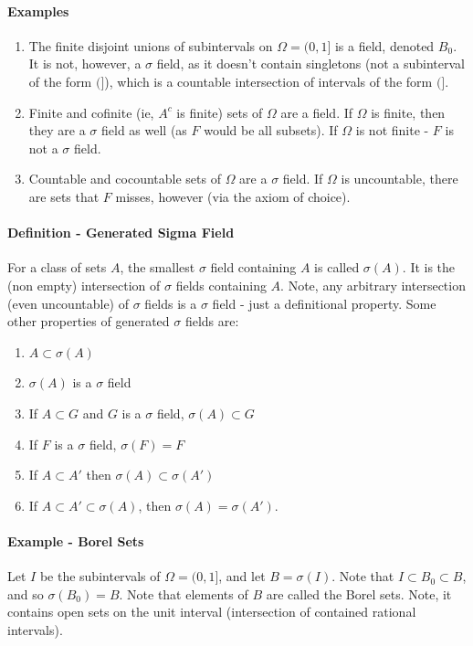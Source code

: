 \documentclass[12pt,a4paper]{article}
\newcommand{\1}[1]{\mathbbm{1}\left\{ #1 \right\}}
\begin{document}
\paragraph{Examples}
\begin{enumerate}
	\item The finite disjoint unions of subintervals on $\Omega = (0,1]$ is a field, denoted $B_0$. It is not, however, a $\sigma$ field, as it doesn't contain singletons (not a subinterval of the form $(]$), which is a countable intersection of intervals of the form $(]$.
	
	\item Finite and cofinite (ie, $A^c$ is finite) sets of $\Omega$ are a field. If $\Omega$ is finite, then they are a $\sigma$ field as well (as $F$ would be all subsets). If $\Omega$ is not finite - $F$ is not a $\sigma$ field.
	
	\item Countable and cocountable sets of $\Omega$ are a $\sigma$ field. If $\Omega$ is uncountable, there are sets that $F$ misses, however (via the axiom of choice).
\end{enumerate}

\paragraph{Definition - Generated Sigma Field} For a class of sets $A$, the smallest $\sigma$ field containing $A$ is called $\sigma(A)$. It is the (non empty) intersection of $\sigma$ fields containing $A$. Note, any arbitrary intersection (even uncountable) of $\sigma$ fields is a $\sigma$ field - just a definitional property. Some other properties of generated $\sigma$ fields are:
\begin{enumerate}
	\item $A \subset \sigma(A)$
	\item $\sigma(A)$ is a $\sigma$ field
	\item If $A \subset G$ and $G$ is a $\sigma$ field, $\sigma(A) \subset G$
	\item If $F$ is a $\sigma$ field, $\sigma(F) = F$
	\item If $A \subset A'$ then $\sigma(A) \subset \sigma(A')$
	\item If $A \subset A' \subset \sigma(A)$, then $\sigma(A) = \sigma(A')$.
\end{enumerate}

\paragraph{Example - Borel Sets} Let $I$ be the subintervals of $\Omega = (0,1]$, and let $B = \sigma(I)$. Note that $I \subset B_0 \subset B$, and so $\sigma(B_0) = B$. Note that elements of $B$ are called the Borel sets. Note, it contains open sets on the unit interval (intersection of contained rational intervals).
\end{document}

